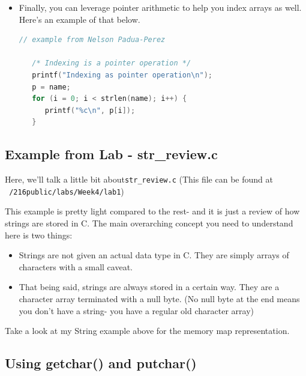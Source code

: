 \documentclass[english, 10pt]{article}
\begin{document}
\begin{itemize}
\begin{lstlisting}[language=C]
\end{lstlisting}

\item Finally, you can leverage pointer arithmetic to help you index arrays as well. Here's an example of that below.


\begin{lstlisting}[language=C]
// example from Nelson Padua-Perez

   /* Indexing is a pointer operation */                                              
   printf("Indexing as pointer operation\n");                                         
   p = name;                                                                          
   for (i = 0; i < strlen(name); i++) {                                               
      printf("%c\n", p[i]);                                                           
   }

\end{lstlisting}

	
\end{itemize}

\subsection{Example from Lab - str\_review.c}

Here, we'll talk a little bit about\texttt{str\_review.c} \newline (This file can be found at \texttt{~/216public/labs/Week4/lab1}) \newline

This example is pretty light compared to the rest- and it is just a review of how strings are stored in C. The main overarching concept you need to understand here is two things:

\begin{itemize}
	\item Strings are not given an actual data type in C. They are simply arrays of characters with a small caveat.
	\item That being said, strings are always stored in a certain way. They are a character array terminated with a null byte. (No null byte at the end means you don't have a string- you have a regular old character array)
\end{itemize}

Take a look at my String example above for the memory map representation.

\subsection{Using getchar() and putchar()}
\end{document}
